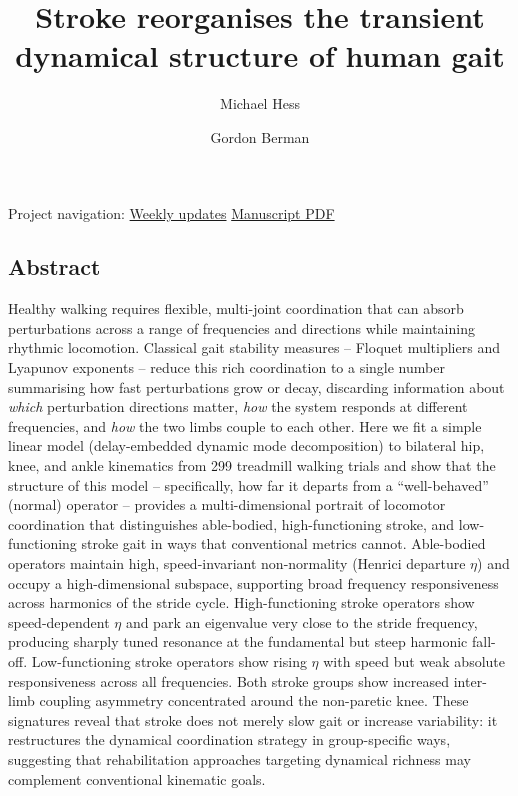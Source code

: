 \documentclass[
  letterpaper,
  DIV=11,
  numbers=noendperiod]{scrartcl}
\title{Stroke reorganises the transient dynamical structure of human
gait}
\author{Michael Hess \and Gordon Berman}
\date{}
\begin{document}
\maketitle


\begin{tcolorbox}[enhanced jigsaw, coltitle=black, colback=white, colbacktitle=quarto-callout-note-color!10!white, opacityback=0, bottomtitle=1mm, breakable, rightrule=.15mm, toprule=.15mm, titlerule=0mm, colframe=quarto-callout-note-color-frame, title=\textcolor{quarto-callout-note-color}{\faInfo}\hspace{0.5em}{Note}, arc=.35mm, bottomrule=.15mm, toptitle=1mm, left=2mm, leftrule=.75mm, opacitybacktitle=0.6]

Project navigation: \href{weekly_updates/}{Weekly updates} \textbar{}
\href{index.pdf}{Manuscript PDF}

\end{tcolorbox}

\subsection{Abstract}\label{abstract}

Healthy walking requires flexible, multi-joint coordination that can
absorb perturbations across a range of frequencies and directions while
maintaining rhythmic locomotion. Classical gait stability measures --
Floquet multipliers and Lyapunov exponents -- reduce this rich
coordination to a single number summarising how fast perturbations grow
or decay, discarding information about \emph{which} perturbation
directions matter, \emph{how} the system responds at different
frequencies, and \emph{how} the two limbs couple to each other. Here we
fit a simple linear model (delay-embedded dynamic mode decomposition) to
bilateral hip, knee, and ankle kinematics from 299 treadmill walking
trials and show that the structure of this model -- specifically, how
far it departs from a ``well-behaved'' (normal) operator -- provides a
multi-dimensional portrait of locomotor coordination that distinguishes
able-bodied, high-functioning stroke, and low-functioning stroke gait in
ways that conventional metrics cannot. Able-bodied operators maintain
high, speed-invariant non-normality (Henrici departure \(\eta\)) and
occupy a high-dimensional subspace, supporting broad frequency
responsiveness across harmonics of the stride cycle. High-functioning
stroke operators show speed-dependent \(\eta\) and park an eigenvalue
very close to the stride frequency, producing sharply tuned resonance at
the fundamental but steep harmonic fall-off. Low-functioning stroke
operators show rising \(\eta\) with speed but weak absolute
responsiveness across all frequencies. Both stroke groups show increased
inter-limb coupling asymmetry concentrated around the non-paretic knee.
These signatures reveal that stroke does not merely slow gait or
increase variability: it restructures the dynamical coordination
strategy in group-specific ways, suggesting that rehabilitation
approaches targeting dynamical richness may complement conventional
kinematic goals.
\end{document}
